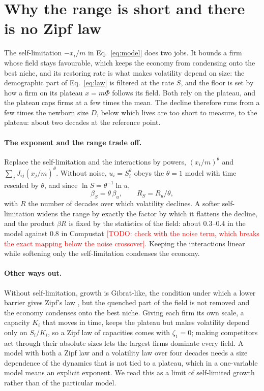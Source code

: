 \documentclass[pre,twocolumn,superscriptaddress,nofootinbib]{revtex4-2}
\newcommand{\todo}[1]{\textcolor{red}{[TODO: #1]}}
\begin{document}
\section{Why the range is short and there is no Zipf law}
\label{sec:limits}

The self-limitation $-x_i/m$ in Eq.~\eqref{eq:model} does two jobs.  It bounds a firm whose field stays
favourable, which keeps the economy from condensing onto the best niche, and its restoring rate is
what makes volatility depend on size: the demographic part of Eq.~\eqref{eq:law} is filtered at the
rate $S$, and the floor is set by how a firm on its plateau $x=m\Phi$ follows its field.  Both rely on the
plateau, and the plateau caps firms at a few times the mean.  The decline therefore runs from a few
times the newborn size $D$, below which lives are too short to measure, to the plateau: about two
decades at the reference point.

\paragraph{The exponent and the range trade off.}  Replace the self-limitation and the interactions by
powers, $(x_i/m)^\theta$ and $\sum_jJ_{ij}(x_j/m)^\theta$.  Without noise, $u_i=S_i^\theta$ obeys the
$\theta=1$ model with time rescaled by $\theta$, and since $\ln S=\theta^{-1}\ln u$,
\begin{equation}
\beta_S=\theta\,\beta_u,\qquad R_S=R_u/\theta,
\label{eq:product}
\end{equation}
with $R$ the number of decades over which volatility declines.  A softer self-limitation widens the
range by exactly the factor by which it flattens the decline, and the product $\beta R$ is fixed by the
statistics of the field: about $0.3$--$0.4$ in the model against $0.8$ in Compustat \todo{check with the
noise term, which breaks the exact mapping below the noise crossover}.  Keeping the interactions
linear while softening only the self-limitation condenses the economy.

\paragraph{Other ways out.}  Without self-limitation, growth is Gibrat-like, the condition under which a
lower barrier gives Zipf's law \cite{gabaix1999}, but the quenched part of the field is not removed and
the economy condenses onto the best niche.  Giving each firm its own scale, a capacity $K_i$ that
moves in time, keeps the plateau but makes volatility depend only on $S_i/K_i$, so a Zipf law of
capacities comes with $\zeta_1=0$; making competitors act through their absolute sizes lets the largest
firms dominate every field.  A model with both a Zipf law and a volatility law over four decades
needs a size dependence of the dynamics that is not tied to a plateau, which in a one-variable model
means an explicit exponent.  We read this as a limit of self-limited growth rather than of the
particular model.
\end{document}
